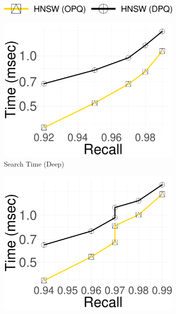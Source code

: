 \begin{figure}[htbp]
	\captionsetup{justification=centering}
	\centering	
\centering
    \begin{subfigure}[b]{0.4\textwidth}
        \includegraphics[width=\textwidth]{../img/oigas/PQVSPQS/legend.png}
    \end{subfigure}
    
    \centering
    \begin{subfigure}[b]{0.2325\textwidth}
        \captionsetup{justification=centering}
	\centering	
        \includegraphics[width=\textwidth]{../img/oigas/PQVSPQS/25GB/deep_10_Time.pdf}
        \caption{Search Time (Deep)}
        \label{fig:hnswdpa:25:25GB_Deep_Time}
    \end{subfigure}
    \begin{subfigure}[b]{0.2325\textwidth}
        \captionsetup{justification=centering}
	\centering	
        \includegraphics[width=\textwidth]{../img/oigas/PQVSPQS/25GB/sift_10_Time.pdf}

\end{subfigure}
\end{figure}

